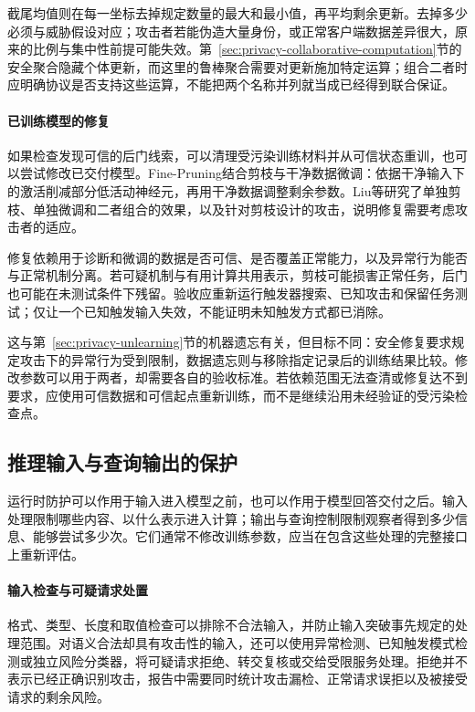 截尾均值则在每一坐标去掉规定数量的最大和最小值，再平均剩余更新。去掉多少必须与威胁假设对应；攻击者若能伪造大量身份，或正常客户端数据差异很大，原来的比例与集中性前提可能失效。第~\ref{sec:privacy-collaborative-computation}节的安全聚合隐藏个体更新，而这里的鲁棒聚合需要对更新施加特定运算；组合二者时应明确协议是否支持这些运算，不能把两个名称并列就当成已经得到联合保证。

\paragraph{已训练模型的修复}

如果检查发现可信的后门线索，可以清理受污染训练材料并从可信状态重训，也可以尝试修改已交付模型。Fine-Pruning结合剪枝与干净数据微调：依据干净输入下的激活削减部分低活动神经元，再用干净数据调整剩余参数。Liu等研究了单独剪枝、单独微调和二者组合的效果，以及针对剪枝设计的攻击，说明修复需要考虑攻击者的适应。

修复依赖用于诊断和微调的数据是否可信、是否覆盖正常能力，以及异常行为能否与正常机制分离。若可疑机制与有用计算共用表示，剪枝可能损害正常任务，后门也可能在未测试条件下残留。验收应重新运行触发器搜索、已知攻击和保留任务测试；仅让一个已知触发输入失效，不能证明未知触发方式都已消除。

这与第~\ref{sec:privacy-unlearning}节的机器遗忘有关，但目标不同：安全修复要求规定攻击下的异常行为受到限制，数据遗忘则与移除指定记录后的训练结果比较。修改参数可以用于两者，却需要各自的验收标准。若依赖范围无法查清或修复达不到要求，应使用可信数据和可信起点重新训练，而不是继续沿用未经验证的受污染检查点。

\subsection{推理输入与查询输出的保护}
\label{sec:security-information-defense}
\label{sec:security-input-defense}

运行时防护可以作用于输入进入模型之前，也可以作用于模型回答交付之后。输入处理限制哪些内容、以什么表示进入计算；输出与查询控制限制观察者得到多少信息、能够尝试多少次。它们通常不修改训练参数，应当在包含这些处理的完整接口上重新评估。

\paragraph{输入检查与可疑请求处置}

格式、类型、长度和取值检查可以排除不合法输入，并防止输入突破事先规定的处理范围。对语义合法却具有攻击性的输入，还可以使用异常检测、已知触发模式检测或独立风险分类器，将可疑请求拒绝、转交复核或交给受限服务处理。拒绝并不表示已经正确识别攻击，报告中需要同时统计攻击漏检、正常请求误拒以及被接受请求的剩余风险。

